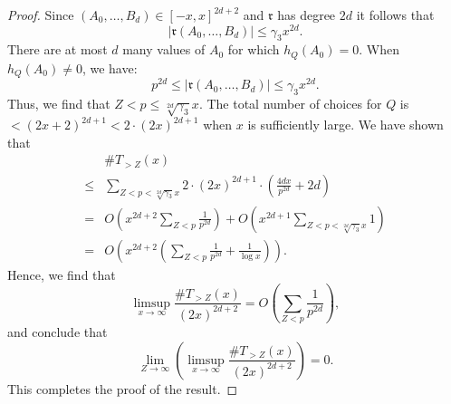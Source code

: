 \documentclass[12pt]{amsart}
\numberwithin{equation}{section}
\begin{document}
\begin{proof}
    Since 
    $(A_0, \dots, B_d)\in [-x, x]^{2d+2}$ and $\mathfrak{r}$ has degree $2d$ it follows that 
    \[|\mathfrak{r}(A_0, \dots, B_d)|\leq \gamma_3 x^{2d}.\] There are at most $d$ many values of $A_0$ for which $h_Q(A_0)=0$. When $h_Q(A_0)\neq 0$, we have: 
    \[p^{2d}\leq |\mathfrak{r}(A_0, \dots, B_d)|\leq \gamma_3 x^{2d}.\]
    Thus, we find that $Z<p\leq \sqrt[2d]{\gamma_3} x$. The total number of choices for $Q$ is $< (2x+2)^{2d+1}<2\cdot (2x)^{2d+1}$ when $x$ is sufficiently large. We have shown that \[\begin{split} & \# T_{>Z}(x) \\ 
    \leq & \sum_{Z<p< \sqrt[2d]{\gamma_3}x} 2\cdot(2x)^{2d+1}\cdot\left(\frac{4d x}{p^{2d}}+ 2d\right) \\  
    =& O\left(x^{2d+2} \sum_{Z<p} \frac{1}{p^{2d}}\right)+O\left(x^{2d+1}\sum_{Z<p< \sqrt[2d]{\gamma_3}x} 1\right) \\
    = & O\left(x^{2d+2} \left(\sum_{Z<p} \frac{1}{p^{2d}}+\frac{1}{\log x}\right)\right). \end{split}\]
    Hence, we find that 
    \[\limsup_{x\rightarrow \infty} \frac{\#T_{>Z}(x)}{(2x)^{2d+2}}= O\left( \sum_{Z<p} \frac{1}{p^{2d}}\right),\] and conclude that
     \[\lim_{Z\rightarrow \infty} \left(\limsup_{x\rightarrow \infty} \frac{\# T_{>Z}(x)}{(2x)^{2d+2}}\right)=0.\]
     This completes the proof of the result. 
\end{proof}
\end{document}
